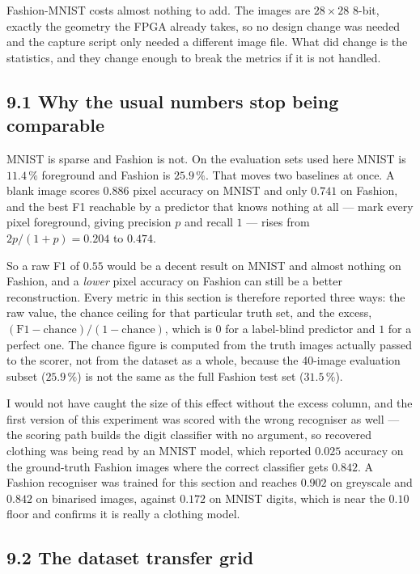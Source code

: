 \documentclass[11pt,a4paper]{article}
\begin{document}
Fashion-MNIST costs almost nothing to add. The images are $28\times28$ 8-bit, exactly the
geometry the FPGA already takes, so no design change was needed and the capture script
only needed a different image file. What did change is the statistics, and they change
enough to break the metrics if it is not handled.

\subsection*{9.1 Why the usual numbers stop being comparable}

MNIST is sparse and Fashion is not. On the evaluation sets used here MNIST is
$11.4\,\%$ foreground and Fashion is $25.9\,\%$. That moves two baselines at once. A
blank image scores $0.886$ pixel accuracy on MNIST and only $0.741$ on Fashion, and the
best F1 reachable by a predictor that knows nothing at all --- mark every pixel
foreground, giving precision $p$ and recall $1$ --- rises from $2p/(1+p) = 0.204$ to
$0.474$.

So a raw F1 of $0.55$ would be a decent result on MNIST and almost nothing on Fashion,
and a \emph{lower} pixel accuracy on Fashion can still be a better reconstruction. Every
metric in this section is therefore reported three ways: the raw value, the chance
ceiling for that particular truth set, and the excess, $(\mathrm{F1} -
\mathrm{chance})/(1 - \mathrm{chance})$, which is $0$ for a label-blind predictor and $1$
for a perfect one. The chance figure is computed from the truth images actually passed to
the scorer, not from the dataset as a whole, because the 40-image evaluation subset
($25.9\,\%$) is not the same as the full Fashion test set ($31.5\,\%$).

I would not have caught the size of this effect without the excess column, and the first
version of this experiment was scored with the wrong recogniser as well --- the scoring
path builds the digit classifier with no argument, so recovered clothing was being read
by an MNIST model, which reported $0.025$ accuracy on the ground-truth Fashion images
where the correct classifier gets $0.842$. A Fashion recogniser was trained for this
section and reaches $0.902$ on greyscale and $0.842$ on binarised images, against
$0.172$ on MNIST digits, which is near the $0.10$ floor and confirms it is really a
clothing model.

\subsection*{9.2 The dataset transfer grid}
\end{document}
